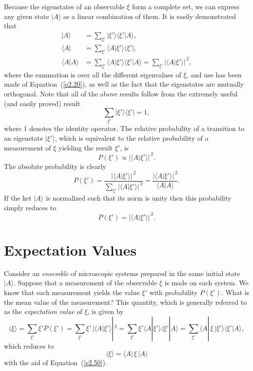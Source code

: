 Because the eigenstates of an observable $\xi$  form a complete
set, we can express any given state $|A\rangle$ as a linear combination of them.
It is easily demonstrated that
\begin{align}\label{e2.49a}
|A\rangle &= \sum_{\xi'} |\xi'\rangle \langle\xi'|A\rangle,\\[0.5ex]
\langle A|&= \sum_{\xi'} \langle A|\xi'\rangle \langle\xi'|,\\[0.5ex]
\langle A|A\rangle&= \sum_{\xi'} \langle A|\xi'\rangle
 \langle\xi'|A\rangle 
= \sum_{\xi'}|\langle A|\xi' \rangle|^{\,2},\label{e2.49c}
\end{align}
where the summation is over all the different eigenvalues of
$\xi$, and use has been
made of Equation~(\ref{e2.20}), as well as 
the fact that the eigenstates are mutually  orthogonal. Note that all of the
above results follow from the extremely useful (and easily proved) result
\begin{equation}\label{e2.50}
\sum_{\xi'} |\xi'\rangle \langle \xi'| = 1,
\end{equation}
where 1 denotes the identity operator.
The relative
probability of a transition to an eigenstate $|\xi'\rangle$, which is
equivalent to 
the relative probability of a measurement of $\xi$ yielding the result $\xi'$, is
\begin{equation}
P(\xi') \propto |\langle A| \xi'\rangle|^{\,2}.
\end{equation}
The absolute probability 
is clearly
\begin{equation}
P(\xi') = \frac{ |\langle A| \xi'\rangle|^{\,2}}{\sum_{\xi'}|\langle A| \xi'\rangle|^{\,2}}
=\frac{|\langle A| \xi'\rangle|^{\,2}}{\langle A|A\rangle}.
\end{equation}
If the ket  $|A\rangle$ is normalized such that its norm is unity  then this
probability simply reduces to
\begin{equation}
P(\xi')= |\langle A| \xi'\rangle|^{\,2}.
\end{equation}

\section{Expectation Values}\label{s2.11}
Consider an {\em ensemble}\/ of microscopic systems  prepared in the
same initial state $|A\rangle$. Suppose that a measurement of the observable $\xi$ is
made on each  system. We know that each  measurement yields the value $\xi'$ with
probability $P(\xi')$. What is the mean value of the measurement? This quantity,
which is generally referred to as the {\em expectation value}\/ of $\xi$, is
given by
\begin{equation}
\langle\xi\rangle =
 \sum_{\xi'} \xi' P(\xi') = \sum_{\xi'} \xi'\,|\langle A|\xi'\rangle|^{\,2}
= \sum_{\xi'} \xi' \langle A|\xi'\rangle \langle \xi' | A\rangle
= \sum_{\xi'} \langle A|\,\xi\,|\xi'\rangle \langle \xi'|A\rangle,
\end{equation}
which reduces to 
\begin{equation}
\langle\xi\rangle = \langle A|\,\xi\,|A\rangle
\end{equation}
with the aid of Equation~(\ref{e2.50}). 

